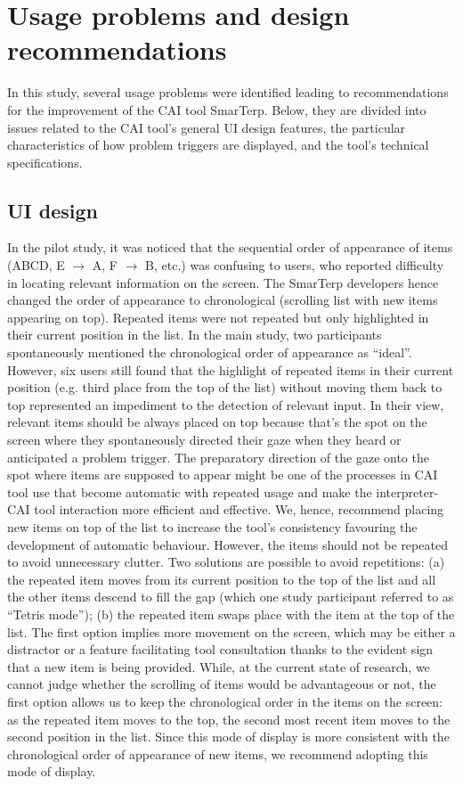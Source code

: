 \section{Usage problems and design recommendations}

In this study, several usage problems were identified leading to recommendations for the improvement of the CAI tool SmarTerp. Below, they are divided into issues related to the CAI tool’s general UI design features, the particular characteristics of how problem triggers are displayed, and the tool’s technical specifications.




\subsection{UI design}

In the pilot study, it was noticed that the sequential order of appearance of items (ABCD, E $\longrightarrow$ A, F $\longrightarrow$ B, etc.) was confusing to users, who reported difficulty in locating relevant information on the screen. The SmarTerp developers hence changed the order of appearance to chronological (scrolling list with new items appearing on top). Repeated items were not repeated but only highlighted in their current position in the list. In the main study, two participants spontaneously mentioned the chronological order of appearance as ``ideal''. However, six users still found that the highlight of repeated items in their current position (e.g. third place from the top of the list) without moving them back to top represented an impediment to the detection of relevant input. In their view, relevant items should be always placed on top because that’s the spot on the screen where they spontaneously directed their gaze when they heard or anticipated a problem trigger. The preparatory direction of the gaze onto the spot where items are supposed to appear might be one of the processes in CAI tool use that become automatic with repeated usage and make the interpreter-CAI tool interaction more efficient and effective. We, hence, recommend placing new items on top of the list to increase the tool’s consistency favouring the development of automatic behaviour. However, the items should not be repeated to avoid unnecessary clutter. Two solutions are possible to avoid repetitions: (a) the repeated item moves from its current position to the top of the list and all the other items descend to fill the gap (which one study participant referred to as ``Tetris mode''); (b) the repeated item swaps place with the item at the top of the list. The first option implies more movement on the screen, which may be either a distractor or a feature facilitating tool consultation thanks to the evident sign that a new item is being provided. While, at the current state of research, we cannot judge whether the scrolling of items would be advantageous or not, the first option allows us to keep the chronological order in the items on the screen: as the repeated item moves to the top, the second most recent item moves to the second position in the list. Since this mode of display is more consistent with the chronological order of appearance of new items, we recommend adopting this mode of display.

